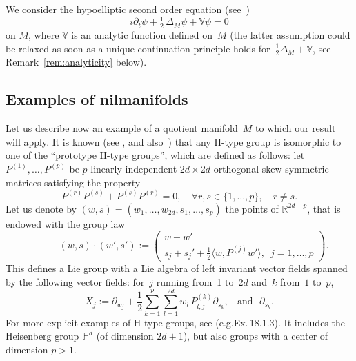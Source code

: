 \documentclass[10pt]{amsart}
\theoremstyle{plain}
\theoremstyle{definition}
\def\R{{\mathbb R}}
\def\bbH{{\mathbb H}}
\def\bbV{{\mathbb V}}
\providecommand{\eg}{e.g.}\providecommand{\ie}{i.e.}\providecommand{\etc}{etc.}
\begin{document}
We consider the
hypoelliptic second order equation (see~\cite{Hor67})
\begin{equation} \label{e:Schrod}
i\partial_t \psi+\tfrac 12\, \Delta_M \psi +\bbV \psi =0
\end{equation}
on $M$, where $\bbV$ is an analytic function defined on~$M$ (the latter assumption could be relaxed as soon as a unique continuation principle holds for~$\frac12\Delta_M+\bbV$, see Remark~\ref{rem:analyticity} below).

\subsection{Examples of nilmanifolds}\label{s:exampleinheis}
Let us describe now an example of a quotient manifold~$M$ to which our result will apply. It is known (see \cite[Th.\,18.2.1]{BLU}, and also~\cite{BFG2}) that any H-type group is isomorphic to one of the ``prototype H-type groups'', which are defined as follows:
let $P^{(1)},\ldots,P^{(p)}$ be $p$ linearly independent $2d \times 2d$ orthogonal skew-symmetric matrices satisfying the property
\[
P^{(r)}P^{(s)}+P^{(s)}P^{(r)}=0,\quad
\forall r,s \in \{1,\dots,p \},\quad r \neq s.
\]
Let us denote by
$ ({w},s)=({w_1,\dots,w_{2d}},s_1,\dots,s_p)$
the points of $\R^{2d+p}$, that is endowed with the group law
\begin{equation*}
\quad \quad \quad ({w},s) \cdot ({w'},s'):=\begin{pmatrix}
w+w' \\s_j+s_j'+\frac12 \langle w, P^{(j)}w' \rangle,\,\,\,j=1,\dots,p
\end{pmatrix}.
\end{equation*}
This defines a Lie group with a Lie algebra of left invariant vector fields
spanned by the following vector fields: for~$
j$ running from~1 to~$2d$ and~$k$ from~$ 1$ to~$p$,
\begin{equation*}
X_j\! :=\!\partial_{w_j} + \frac 1 2 \sum^{p}_{k=1}\sum^{2d}_{l=1}w_l \, P_{l,j}^{(k)}\partial_{s_k}, \ \ \ \ \text{and} \ \ \ \partial_{s_k}.
\end{equation*}
For more explicit examples of H-type groups, see \cite[\S 18.1]{BLU} (\eg Ex.\,18.1.3). It includes the Heisenberg group $\bbH^d$ (of dimension $2d+1$), but also groups with a center of dimension $p>1$.
\end{document}
